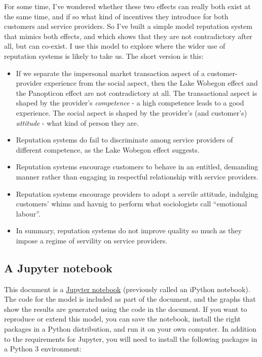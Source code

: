 \documentclass[
  letterpaper,
  DIV=11,
  numbers=noendperiod]{scrartcl}
\begin{document}
For some time, I've wondered whether these two effects can really both
exist at the same time, and if so what kind of incentives they introduce
for both customers and service providers. So I've built a simple model
reputation system that mimics both effects, and which shows that they
are not contradictory after all, but can co-exist. I use this model to
explore where the wider use of reputation systems is likely to take us.
The short version is this:

\begin{itemize}
\item
  If we separate the impersonal market transaction aspect of a
  customer-provider experience from the social aspect, then the Lake
  Wobegon effect and the Panopticon effect are not contradictory at all.
  The transactional aspect is shaped by the provider's \emph{competence}
  - a high competence leads to a good experience. The social aspect is
  shaped by the provider's (and customer's) \emph{attitude} - what kind
  of person they are.
\item
  Reputation systems do fail to discriminate among service providers of
  different competence, as the Lake Wobegon effect suggests.
\item
  Reputation systems encourage customers to behave in an entitled,
  demanding manner rather than engaging in respectful relationship with
  service providers.
\item
  Reputation systems encourage providers to adopt a servile attitude,
  indulging customers' whims and havnig to perform what sociologists
  call ``emotional labour''.
\item
  In summary, reputation systems do not improve quality so much as they
  impose a regime of servility on service providers.
\end{itemize}

\hypertarget{a-jupyter-notebook}{%
\subsection{A Jupyter notebook}\label{a-jupyter-notebook}}

This document is a \href{http://jupyter.org/}{Jupyter notebook}
(previously called an iPython notebook). The code for the model is
included as part of the document, and the graphs that show the results
are generated using the code in the document. If you want to reproduce
or extend this model, you can save the notebook, install the right
packages in a Python distribution, and run it on your own computer. In
addition to the requirements for Jupyter, you will need to install the
following packages in a Python 3 environment:
\end{document}
